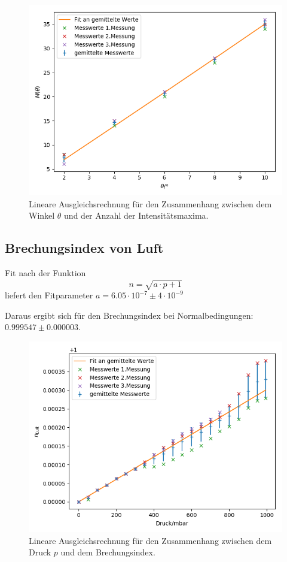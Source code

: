 \begin{figure}[h]
\centering
\includegraphics[width=\linewidth]{img/n_glas.png}
\caption{Lineare Ausgleichsrechnung für den Zusammenhang zwischen dem Winkel $\theta$ und der Anzahl
der Intensitätsmaxima.}
\label{n_glas}
\end{figure}

\subsection{Brechungsindex von Luft}

Fit nach der Funktion
\[
n = \sqrt{a \cdot p + 1}
\]
liefert den Fitparameter $a = 6.05 \cdot 10^{-7} \pm 4 \cdot 10^{-9}$

Daraus ergibt sich für den Brechungsindex bei Normalbedingungen: $0.999547 \pm 0.000003$.

\begin{figure}[h]
\centering
\includegraphics[width=\linewidth]{img/n_luft.png}
\caption{Lineare Ausgleichsrechnung für den Zusammenhang zwischen dem Druck $p$ und dem Brechungsindex.}
\label{n_luft}
\end{figure}
